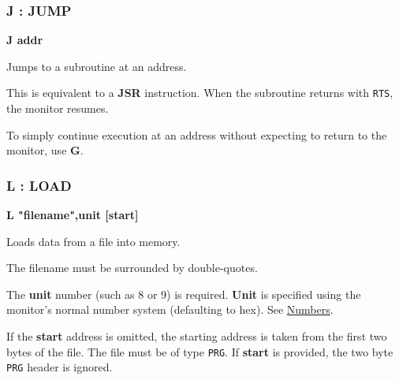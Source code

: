 \subsubsection{J : JUMP}
\begin{description}[leftmargin=2cm,style=nextline]
\item [Format:] {\bf J addr}
\item [Usage:] Jumps to a subroutine at an address.

\item [Remarks:] This is equivalent to a {\bf JSR} instruction. When the subroutine returns with {\tt RTS}, the monitor resumes.

    To simply continue execution at an address without expecting to return to the monitor, use {\bf G}.

\end{description}


\subsubsection{L : LOAD}
\begin{description}[leftmargin=2cm,style=nextline]
\item [Format:] {\bf L "filename",unit [start]}
\item [Usage:] Loads data from a file into memory.

\item [Remarks:] The filename must be surrounded by double-quotes.

    The {\bf unit} number (such as 8 or 9) is required. {\bf Unit} is specified using the monitor's normal number system (defaulting to hex). See \hyperref[sec:numbers]{Numbers}.

    If the {\bf start} address is omitted, the starting address is taken from the first two bytes of the file. The file must be of type {\tt PRG}. If {\bf start} is provided, the two byte {\tt PRG} header is ignored.

\end{description}


